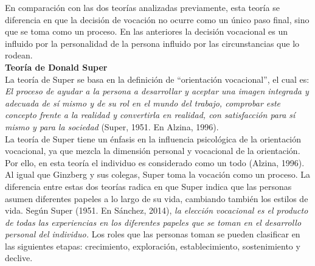 	En comparación con las dos teorías analizadas previamente, esta teoría se diferencia en que la decisión de vocación no ocurre como un único paso final, sino que se toma como un proceso. En las anteriores la decisión vocacional es un influido por la personalidad de la persona influido por las circunstancias que lo rodean.\\
	
	\textbf{Teoría de Donald Super}\\
	
	La teoría de Super se basa en la definición de “orientación vocacional”, el cual es:
	\textit{El proceso de ayudar a la persona a desarrollar y aceptar una imagen integrada y adecuada de sí mismo y de su rol en el mundo del trabajo, comprobar este concepto frente a la realidad y convertirla en realidad, con satisfacción para sí mismo y para la sociedad} (Super, 1951. En Alzina, 1996).\\
	
	La teoría de Super tiene un énfasis en la influencia psicológica de la orientación vocacional, ya que mezcla la dimensión personal y vocacional de la orientación. Por ello, en esta teoría el individuo es considerado como un todo (Alzina, 1996).\\
	
	Al igual que Ginzberg y sus colegas, Super toma la vocación como un proceso. La diferencia entre estas dos teorías radica en que Super indica que las personas asumen diferentes papeles a lo largo de su vida, cambiando también los estilos de vida. Según Super (1951. En Sánchez, 2014), \textit{la elección vocacional es el producto de todas las experiencias en los diferentes papeles que se toman en el desarrollo personal del individuo.} Los roles que las personas toman se pueden clasificar en las siguientes etapas: crecimiento, exploración, establecimiento, sostenimiento y declive.



